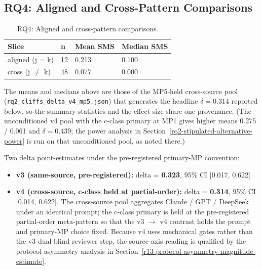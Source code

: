 \documentclass[manuscript,screen,review]{acmart}
\begin{document}
\subsection{RQ4: Aligned and Cross-Pattern Comparisons}\label{rq2-aligned-vs-cross-cliffs-delta}

{%
\begin{longtable}[]{@{}llll@{}}
\caption{RQ4: Aligned and cross-pattern comparisons.}\label{tab:p2-09}\\
\toprule\noalign{}
Slice & n & Mean SMS & Median SMS \\
\midrule\noalign{}
\endhead
\bottomrule\noalign{}
\endlastfoot
aligned (j = k) & 12 & 0.213 & 0.100 \\
cross (j $\neq$ k) & 48 & 0.077 & 0.000 \\
\end{longtable}
}

The means and medians above are those of the MP5-held cross-source pool
(\texttt{rq2\_cliffs\_delta\_v4\_mp5.json}) that generates the headline
$\delta = 0.314$ reported below, so the summary statistics and the effect
size share one provenance. (The unconditioned v4 pool with the c-class
primary at MP1 gives higher means 0.275 / 0.061 and $\delta = 0.439$; the
power analysis in Section~\ref{rq2-stipulated-alternative-power} is run on
that unconditioned pool, as noted there.)

Two delta point-estimates under the pre-registered primary-MP
convention:

\begin{itemize}

\item
  \textbf{v3 (same-source, pre-registered):} delta = \textbf{0.323},
  95\% CI {[}0.017, 0.622{]}
\item
  \textbf{v4 (cross-source, c-class held at partial-order):} delta =
  \textbf{0.314}, 95\% CI {[}0.014, 0.622{]}. The cross-source pool
  aggregates Claude / GPT / DeepSeek under an identical prompt; the
  c-class primary is held at the pre-registered partial-order
  meta-pattern so that the v3 $\to$ v4
  contrast holds the prompt and primary-MP choice fixed. Because v4 uses
  mechanical gates rather than the v3 dual-blind reviewer step, the
  source-axis reading is qualified by the protocol-asymmetry analysis in
  Section~\ref{r13-protocol-asymmetry-magnitude-estimate}.
\end{itemize}
\end{document}
